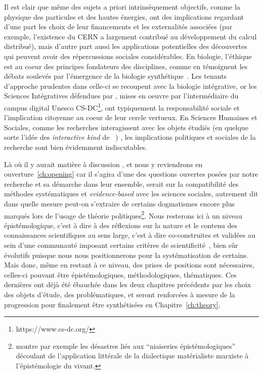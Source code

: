  Il est clair que même des sujets a priori intrinsèquement objectifs, comme la physique des particules et des hautes énergies, ont des implications regardant d'une part les choix de leur financements et les externalités associées (par exemple, l'existence du CERN a largement contribué au développement du calcul distribué), mais d'autre part aussi les applications potentielles des découvertes qui peuvent avoir des répercussions sociales considérables. En biologie, l'éthique est au coeur des principes fondateurs des disciplines, comme en témoignent les débats soulevés par l'émergence de la biologie synthétique~\cite{gutmann2011ethics}. Les tenants d'approche prudentes dans celle-ci se recoupent avec la biologie intégrative, or les Sciences Intégratives défendues par , mises en oeuvre par l'intermédiaire du campus digital Unesco CS-DC\footnote{https://www.cs-dc.org/}, ont typiquement la responsabilité sociale et l'implication citoyenne au coeur de leur cercle vertueux. En Sciences Humaines et Sociales, comme les recherches interagissent avec les objets étudiés (en quelque sorte l'idée des \emph{interactive kind} de ~\cite{hacking1999social})%
 , les implications politiques et sociales de la recherche sont bien évidemment indiscutables.
 
Là où il y aurait matière à discussion %
 , et nous y reviendrons en ouverture~\ref{ch:opening} car il s'agira d'une des questions ouvertes posées par notre recherche et sa démarche dans leur ensemble, serait sur la compatibilité des méthodes systématiques et \emph{evidence-based} %
  avec les sciences sociales, autrement dit dans quelle mesure peut-on s'extraire de certains dogmatismes %
   encore plus marqués lors de l'usage de théorie politiques\footnote{ montre par exemple les désastres liés aux ``niaiseries épistémologiques'' découlant de l'application littérale de la dialectique matérialiste marxiste à l'épistémologie du vivant.}. Nous resterons ici à un niveau épistémologique, c'est à dire à des réflexions sur la nature et le contenu des connaissances scientifiques au sens large, c'est à dire co-construites et validées au sein d'une communauté imposant certains critères de scientificité~\cite{morin1991methode}, bien sûr évolutifs puisque nous nous positionnerons pour la systématisation de certains. Mais donc, même en restant à ce niveau, des prises de positions sont nécessaires, celles-ci pouvant être épistémologiques, méthodologiques, thématiques. Ces dernières ont déjà été ébauchée dans les deux chapitres précédents par les choix des objets d'étude, des problématiques, et seront renforcées à mesure de la progression pour finalement être synthétisées en Chapitre~\ref{ch:theory}.
 
